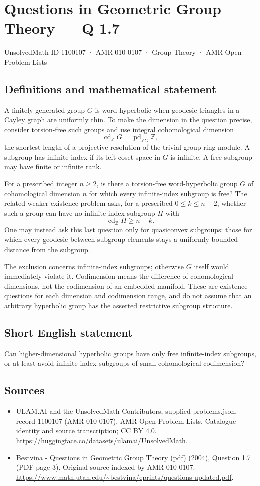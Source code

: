 \documentclass[11pt,a4paper]{article}
\begin{document}
\section*{Questions in Geometric Group Theory — Q 1.7}\label{1100107}
{\small UnsolvedMath ID 1100107 · AMR-010-0107 · Group Theory · AMR Open Problem Lists}
\subsection{Definitions and mathematical statement}
A finitely generated group $G$ is word-hyperbolic when geodesic triangles in a Cayley graph are uniformly thin. To make the dimension in the question precise, consider torsion-free such groups and use integral cohomological dimension
\[
 \operatorname{cd}_{\mathbb Z}G
 =\operatorname{pd}_{\mathbb ZG}\mathbb Z,
\]
the shortest length of a projective resolution of the trivial group-ring module. A subgroup has infinite index if its left-coset space in $G$ is infinite. A free subgroup may have finite or infinite rank.

For a prescribed integer $n\geq2$, is there a torsion-free word-hyperbolic group $G$ of cohomological dimension $n$ for which every infinite-index subgroup is free? The related weaker existence problem asks, for a prescribed $0\leq k\leq n-2$, whether such a group can have no infinite-index subgroup $H$ with
\[
 \operatorname{cd}_{\mathbb Z}H\geq n-k.
\]
One may instead ask this last question only for quasiconvex subgroups: those for which every geodesic between subgroup elements stays a uniformly bounded distance from the subgroup.

The exclusion concerns infinite-index subgroups; otherwise $G$ itself would immediately violate it. Codimension means the difference of cohomological dimensions, not the codimension of an embedded manifold. These are existence questions for each dimension and codimension range, and do not assume that an arbitrary hyperbolic group has the asserted restrictive subgroup structure.
\subsection{Short English statement}
Can higher-dimensional hyperbolic groups have only free infinite-index subgroups, or at least avoid infinite-index subgroups of small cohomological codimension?
\subsection{Sources}
\begin{itemize}
\item[S1] ULAM.AI and the UnsolvedMath Contributors, supplied problems.json, record 1100107 (AMR-010-0107), AMR Open Problem Lists. Catalogue identity and source transcription; CC BY 4.0.
\url{https://huggingface.co/datasets/ulamai/UnsolvedMath}.
\item[S2] Bestvina - Questions in Geometric Group Theory (pdf) (2004), Question 1.7 (PDF page 3). Original source indexed by AMR-010-0107.
\url{https://www.math.utah.edu/~bestvina/eprints/questions-updated.pdf}.
\end{itemize}
\end{document}
